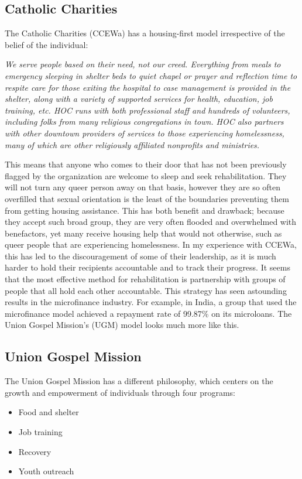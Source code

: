     \subsection{Catholic Charities}
        The Catholic Charities (CCEWa) has a housing-first model irrespective of the belief of the individual\cite{cceasternwa}:
        \par\textit{
            We serve people based on their need, not our creed.
            Everything from meals to emergency sleeping in shelter beds to quiet chapel or prayer and reflection time to respite care for those exiting the hospital to case management is provided in the shelter, along with a variety of supported services for health, education, job training, etc.
            HOC runs with both professional staff and hundreds of volunteers, including folks from many religious congregations in town.
            HOC also partners with other downtown providers of services to those experiencing homelessness, many of which are other religiously affiliated nonprofits and ministries.
        }
        \par This means that anyone who comes to their door that has not been previously flagged by the organization are welcome to sleep and seek rehabilitation.
        They will not turn any queer person away on that basis, however they are so often overfilled that sexual orientation is the least of the boundaries preventing them from getting housing assistance.
        This has both benefit and drawback; because they accept such broad group, they are very often flooded and overwhelmed with benefactors, yet many receive housing help that would not otherwise, such as queer people that are experiencing homelessness.
        In my experience with CCEWa, this has led to the discouragement of some of their leadership, as it is much harder to hold their recipients accountable and to track their progress.
        It seems that the most effective method for rehabilitation is partnership with groups of people that all hold each other accountable.
        This strategy has seen astounding results in the microfinance industry.
        For example, in India, a group that used the microfinance model achieved a repayment rate of 99.87\% on its microloans\cite{soni_2014}.
        The Union Gospel Mission's (UGM) model looks much more like this.

    \subsection{Union Gospel Mission}
        The Union Gospel Mission has a different philosophy, which centers on the growth and empowerment of individuals through four programs\cite{ugm}:
        \begin{itemize}
            \item Food and shelter
            \item Job training
            \item Recovery
            \item Youth outreach
        \end{itemize}
        
